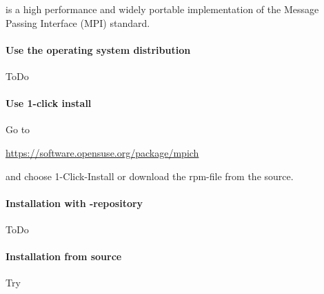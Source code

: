 % 
%               
%          
% 


 is a high performance and widely portable implementation of the Message Passing Interface (MPI) standard.

\paragraph{Use the operating system distribution}

ToDo

\paragraph{Use 1-click install}

Go to

\href{https://software.opensuse.org/package/mpich}{https://software.opensuse.org/package/mpich}

and choose 1-Click-Install or download the rpm-file from the source.

\paragraph{Installation with \marktool{\opensusename}-repository}

ToDo

\paragraph{Installation from source}

Try

\begingroup
\lstset{breaklines=true}
\endgroup 